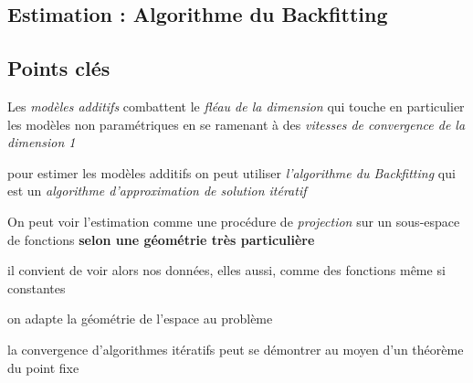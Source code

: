 {
    {
        
    }
    \subsection{Estimation : Algorithme du Backfitting}
    {
        
    }
    \subsection{Points clés}\label{sec:backfitting_key_points}

    \begin{todolist}
        \item Les \emph{modèles additifs} combattent le \emph{fléau de la dimension} qui touche en particulier les modèles non paramétriques en se ramenant à des \emph{vitesses de convergence de la dimension 1}
        \item pour estimer les modèles additifs on peut utiliser \emph{l'algorithme du Backfitting} qui est un \emph{algorithme d'approximation de solution itératif}
        \item On peut voir l'estimation comme une procédure de \emph{projection} sur un sous-espace de fonctions \textbf{selon une géométrie très particulière}
        \item il convient de voir alors nos données, elles aussi, comme des fonctions même si constantes
        \item \longrigharrow on adapte la géométrie de l'espace au problème
        \item la convergence d'algorithmes itératifs peut se démontrer au moyen d'un théorème du point fixe
    \end{todolist}

    }
